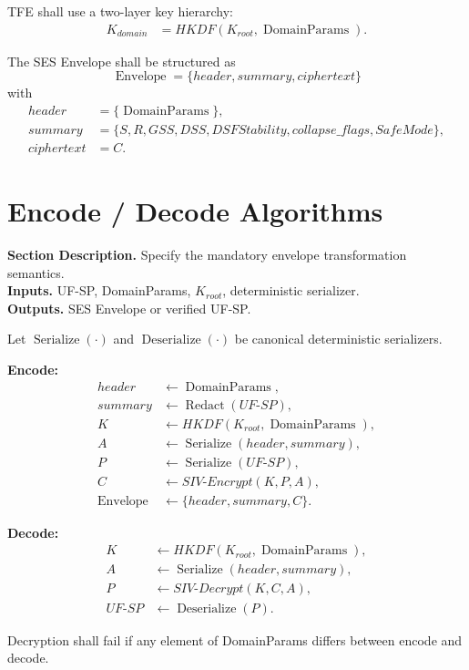\documentclass[11pt]{report}
\newcommand{\meta}[3]{\textbf{Section Description.} #1\\
\textbf{Inputs.} #2\\
\textbf{Outputs.} #3\par}
\begin{document}
TFE shall use a two-layer key hierarchy:
\begin{align*}
K_{domain} &= HKDF(K_{root},\operatorname{DomainParams}).
\end{align*}

The SES Envelope shall be structured as
\[
\operatorname{Envelope} = \{header, summary, ciphertext\}
\]
with
\begin{align*}
header &= \{\operatorname{DomainParams}\},\\
summary &= \{S,R,GSS,DSS,DSFStability,collapse\_flags,SafeMode\},\\
ciphertext &= C.
\end{align*}

\section{Encode / Decode Algorithms}
\meta{Specify the mandatory envelope transformation semantics.}{UF-SP, DomainParams, $K_{root}$, deterministic serializer.}{SES Envelope or verified UF-SP.}

Let $\operatorname{Serialize}(\cdot)$ and $\operatorname{Deserialize}(\cdot)$ be canonical deterministic serializers.

\textbf{Encode:}
\begin{align*}
header &\leftarrow \operatorname{DomainParams},\\
summary &\leftarrow \operatorname{Redact}(UF\mbox{-}SP),\\
K &\leftarrow HKDF(K_{root},\operatorname{DomainParams}),\\
A &\leftarrow \operatorname{Serialize}(header,summary),\\
P &\leftarrow \operatorname{Serialize}(UF\mbox{-}SP),\\
C &\leftarrow SIV\mbox{-}Encrypt(K,P,A),\\
\operatorname{Envelope} &\leftarrow \{header,summary,C\}.
\end{align*}

\textbf{Decode:}
\begin{align*}
K &\leftarrow HKDF(K_{root},\operatorname{DomainParams}),\\
A &\leftarrow \operatorname{Serialize}(header,summary),\\
P &\leftarrow SIV\mbox{-}Decrypt(K,C,A),\\
UF\mbox{-}SP &\leftarrow \operatorname{Deserialize}(P).
\end{align*}

Decryption shall fail if any element of DomainParams differs between encode and decode.
\end{document}
